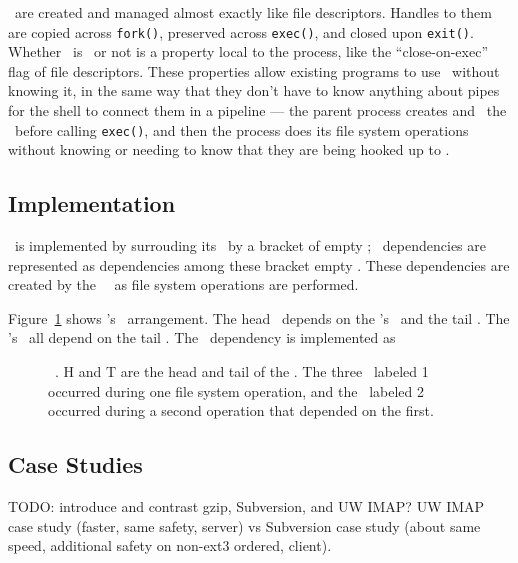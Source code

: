 \Opgroups\ are created and managed almost exactly like file descriptors. Handles
to them are copied across \texttt{fork()}, preserved across \texttt{exec()}, and
closed upon \texttt{exit()}. Whether \anopgroup\ is \engaged\ or not is a
property local to the process, like the ``close-on-exec'' flag of file
descriptors. These properties allow existing programs to use \opgroups\ without
knowing it, in the same way that they don't have to know anything about pipes
for the shell to connect them in a pipeline --- the parent process creates and
\engages\ the \opgroups\ before calling \texttt{exec()}, and then the process
does its file system operations without knowing or needing to know that they are
being hooked up to \anopgroup.



\subsection{Implementation}
\label{sec:opgroup:implementation}

\Anopgroup\ is implemented by surrouding its \patches\ by a bracket of
empty \patches; \opgroup\ dependencies are represented as dependencies
among these bracket empty \patches.
%
These dependencies are created by the \opgroup\ \module\ as file
system operations are performed.

Figure~\ref{fig:opgroup-chdescs} shows \anopgroup's \chdesc\ arrangement.
%
The head \chdesc\ depends on the \opgroup's \chdescs\ and the tail
\chdesc.
%
The \opgroup's \chdescs\ all depend on the tail \chdesc.
%
The \opgroup\ dependency  is implemented as

\begin{figure}[htb]
\caption{\label{fig:opgroup-chdescs} \Opgroup\ \chdescs. H and T are the head
  and tail of the \opgroup.
  The three \chdescs\ labeled 1 occurred during one file system
  operation,
  and the \chdesc\ labeled 2 occurred during a second operation that
  depended on the first.}
\end{figure}

\subsection{Case Studies}
\label{sec:opgroup:casestudies}

TODO: introduce and contrast gzip, Subversion, and UW IMAP?
%
UW IMAP case study (faster, same safety, server) vs
Subversion case study (about same speed, additional safety on non-ext3
ordered, client).

